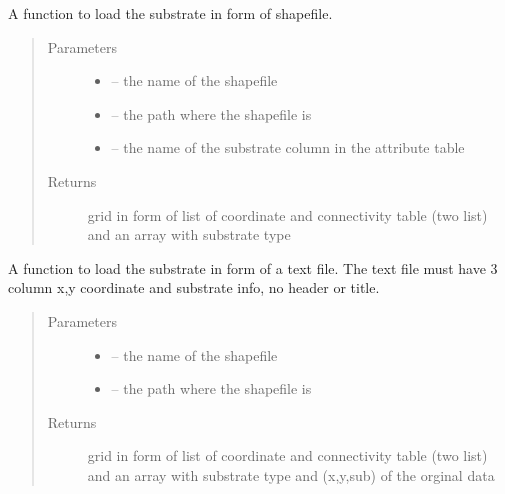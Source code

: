 \documentclass[letterpaper,10pt,english]{sphinxmanual}
\begin{document}
\begin{fulllineitems}
\label{\detokenize{index:src.substrate.load_sub_shp}}
A function to load the substrate in form of shapefile.
\begin{quote}\begin{description}
\item[{Parameters}] \leavevmode\begin{itemize}
\item {} 
 -- the name of the shapefile

\item {} 
 -- the path where the shapefile is

\item {} 
 -- the name of the substrate column in the attribute table

\end{itemize}

\item[{Returns}] \leavevmode
grid in form of list of coordinate and connectivity table (two list)
and an array with substrate type

\end{description}\end{quote}

\end{fulllineitems}


\begin{fulllineitems}
\label{\detokenize{index:src.substrate.load_sub_txt}}
A function to load the substrate in form of a text file. The text file must have 3 column x,y coordinate and
substrate info, no header or title.
\begin{quote}\begin{description}
\item[{Parameters}] \leavevmode\begin{itemize}
\item {} 
 -- the name of the shapefile

\item {} 
 -- the path where the shapefile is

\end{itemize}

\item[{Returns}] \leavevmode
grid in form of list of coordinate and connectivity table (two list)
and an array with substrate type and (x,y,sub) of the orginal data

\end{description}\end{quote}

\end{fulllineitems}
\end{document}
